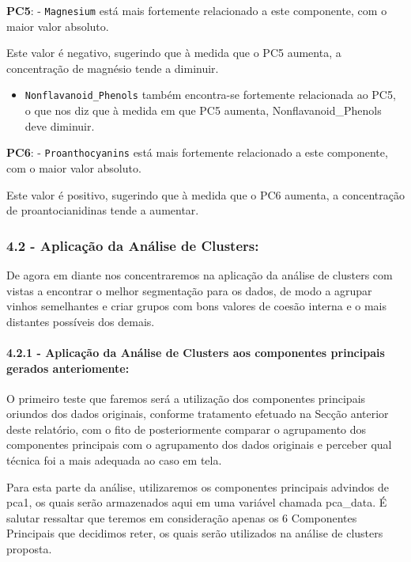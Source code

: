 \documentclass[
  letterpaper,
  DIV=11,
  numbers=noendperiod]{scrartcl}
\let\oldparagraph\paragraph
\renewcommand{\paragraph}[1]{\oldparagraph{#1}\mbox{}}
\providecommand{\tightlist}{%
  \setlength{\itemsep}{0pt}\setlength{\parskip}{0pt}}\usepackage{longtable,booktabs,array}
\begin{document}
\textbf{PC5}: - \texttt{Magnesium} está mais fortemente relacionado a
este componente, com o maior valor absoluto.

Este valor é negativo, sugerindo que à medida que o PC5 aumenta, a
concentração de magnésio tende a diminuir.

\begin{itemize}
\tightlist
\item
  \texttt{Nonflavanoid\_Phenols} também encontra-se fortemente
  relacionada ao PC5, o que nos diz que à medida em que PC5 aumenta,
  Nonflavanoid\_Phenols deve diminuir.
\end{itemize}

\textbf{PC6}: - \texttt{Proanthocyanins} está mais fortemente
relacionado a este componente, com o maior valor absoluto.

Este valor é positivo, sugerindo que à medida que o PC6 aumenta, a
concentração de proantocianidinas tende a aumentar.

\subsubsection{4.2 - Aplicação da Análise de
Clusters:}\label{aplicauxe7uxe3o-da-anuxe1lise-de-clusters}

De agora em diante nos concentraremos na aplicação da análise de
clusters com vistas a encontrar o melhor segmentação para os dados, de
modo a agrupar vinhos semelhantes e criar grupos com bons valores de
coesão interna e o mais distantes possíveis dos demais.

\paragraph{4.2.1 - Aplicação da Análise de Clusters aos componentes
principais gerados
anteriomente:}\label{aplicauxe7uxe3o-da-anuxe1lise-de-clusters-aos-componentes-principais-gerados-anteriomente}

O primeiro teste que faremos será a utilização dos componentes
principais oriundos dos dados originais, conforme tratamento efetuado na
Secção anterior deste relatório, com o fito de posteriormente comparar o
agrupamento dos componentes principais com o agrupamento dos dados
originais e perceber qual técnica foi a mais adequada ao caso em tela.

Para esta parte da análise, utilizaremos os componentes principais
advindos de pca1, os quais serão armazenados aqui em uma variável
chamada pca\_data. É salutar ressaltar que teremos em consideração
apenas os 6 Componentes Principais que decidimos reter, os quais serão
utilizados na análise de clusters proposta.
\end{document}

